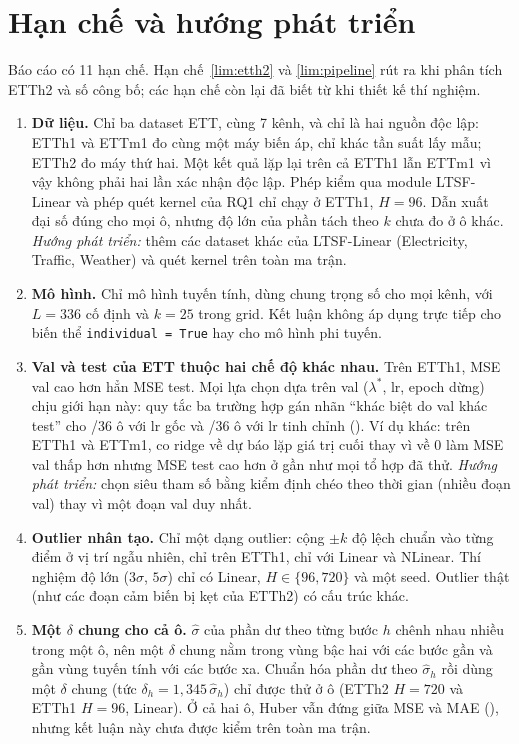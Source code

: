 \section{Hạn chế và hướng phát triển}
\label{sec:limitations}

Báo cáo có 11 hạn chế. Hạn chế~\ref{lim:etth2} và \ref{lim:pipeline} rút ra khi phân tích ETTh2 và số công bố; các hạn chế còn lại đã biết từ khi thiết kế thí nghiệm.

\begin{enumerate}[label=\arabic*., ref=\arabic*]
    \item \label{lim:data}\textbf{Dữ liệu.} Chỉ ba dataset ETT, cùng 7 kênh, và chỉ là hai nguồn độc lập: ETTh1 và ETTm1 đo cùng một máy biến áp, chỉ khác tần suất lấy mẫu; ETTh2 đo máy thứ hai. Một kết quả lặp lại trên cả ETTh1 lẫn ETTm1 vì vậy không phải hai lần xác nhận độc lập. Phép kiểm qua module LTSF-Linear và phép quét kernel của RQ1 chỉ chạy ở ETTh1, $H = 96$. Dẫn xuất đại số đúng cho mọi ô, nhưng độ lớn của phần tách theo $k$ chưa đo ở ô khác. \emph{Hướng phát triển:} thêm các dataset khác của LTSF-Linear (Electricity, Traffic, Weather) và quét kernel trên toàn ma trận.
    \item \label{lim:models}\textbf{Mô hình.} Chỉ mô hình tuyến tính, dùng chung trọng số cho mọi kênh, với $L = 336$ cố định và $k = 25$ trong grid. Kết luận không áp dụng trực tiếp cho biến thể \texttt{individual = True} hay cho mô hình phi tuyến.
    \item \label{lim:valtest}\textbf{Val và test của ETT thuộc hai chế độ khác nhau.} Trên ETTh1, MSE val cao hơn hẳn MSE test. Mọi lựa chọn dựa trên val ($\lambda^*$, lr, epoch dừng) chịu giới hạn này: quy tắc ba trường hợp gán nhãn ``khác biệt do val khác test'' cho \nmBFourValTestCount/36 ô với lr gốc và \nmTunedValTestCount/36 ô với lr tinh chỉnh (). Ví dụ khác: trên ETTh1 và ETTm1, co ridge về dự báo lặp giá trị cuối thay vì về $0$ làm MSE val thấp hơn nhưng MSE test cao hơn ở gần như mọi tổ hợp đã thử. \emph{Hướng phát triển:} chọn siêu tham số bằng kiểm định chéo theo thời gian (nhiều đoạn val) thay vì một đoạn val duy nhất.
    \item \label{lim:outlier}\textbf{Outlier nhân tạo.} Chỉ một dạng outlier: cộng $\pm k$ độ lệch chuẩn vào từng điểm ở vị trí ngẫu nhiên, chỉ trên ETTh1, chỉ với Linear và NLinear. Thí nghiệm độ lớn ($3\sigma$, $5\sigma$) chỉ có Linear, $H \in \{96, 720\}$ và một seed. Outlier thật (như các đoạn cảm biến bị kẹt của ETTh2) có cấu trúc khác.
    \item \label{lim:delta}\textbf{Một $\delta$ chung cho cả ô.} $\hat\sigma$ của phần dư theo từng bước $h$ chênh nhau nhiều trong một ô, nên một $\delta$ chung nằm trong vùng bậc hai với các bước gần và gần vùng tuyến tính với các bước xa. Chuẩn hóa phần dư theo $\hat\sigma_h$ rồi dùng một $\delta$ chung (tức $\delta_h = 1{,}345\,\hat\sigma_h$) chỉ được thử ở \nmDeltaHCellCount{} ô (ETTh2 $H = 720$ và ETTh1 $H = 96$, Linear). Ở cả hai ô, Huber vẫn đứng giữa MSE và MAE (), nhưng kết luận này chưa được kiểm trên toàn ma trận.

\end{enumerate}
